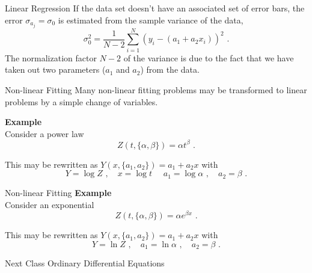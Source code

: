 \documentclass[11pt]{beamer}
\begin{document}
\begin{frame}[fragile]{Linear Regression}
If the data set doesn't have an associated set of error bars, the error
 $\sigma_{a_j} = \sigma_0$ is estimated from the sample variance of the data,
\begin{equation}
\sigma_0^2 = \frac{1}{N-2} \sum_{i=1}^N \left(y_i - (a_1 + a_2 x_i) \right)^2\,\,.
\end{equation}
The normalization factor $N-2$ of the variance is due to the fact that
we have taken out two parameters ($a_1$ and $a_2$) from the
data.
\end{frame}

\begin{frame}[fragile]{Non-linear Fitting}
Many non-linear fitting problems may be transformed to linear
problems by a simple change of variables. \\
\bigskip

\textbf{Example}\\ 
Consider a power law
\begin{equation}
Z(t, \{\alpha,\beta\}) = \alpha t^{\beta}\,\,.
\end{equation}

This may be rewritten as $Y(x, \{a_1,a_2\}) = a_1 + a_2 x$ with
\begin{equation}
Y = \log Z\,\,,\hspace{1em} x = \log t\,\,\hspace{1em} a_1 = \log
\alpha\,\,,\hspace{1em} a_2 = \beta\,\,.
\end{equation}
\end{frame}

\begin{frame}[fragile]{Non-linear Fitting}
\textbf{Example}\\
Consider an exponential
\begin{equation}
Z(t, \{\alpha, \beta\}) = \alpha e^{\beta x}\,\,.
\end{equation}

This may be rewritten as $Y(x, \{a_1,a_2\}) = a_1 + a_2 x$ with
\begin{equation}
Y = \ln Z\,\,,\hspace{1em} a_1 = \ln
\alpha\,\,,\hspace{1em} a_2 = \beta\,\,.
\end{equation}
\end{frame}


\begin{frame}[fragile]{Next Class}
Ordinary Differential Equations
\end{frame}
\end{document}
